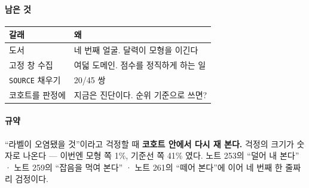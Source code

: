 \documentclass[10pt]{article}
\begin{document}
\paragraph{남은 것}
\begin{center}\small
\begin{tabular}{ll}
\hline
갈래 & 왜 \\
\hline
도서 & 네 번째 얼굴. 달력이 모형을 이긴다 \\
고정 창 수집 & 여덟 도메인. 점수를 정직하게 하는 일 \\
\texttt{SOURCE} 채우기 & 20/45 쌍 \\
코호트를 판정에 & 지금은 진단이다. 순위 기준으로 쓰면? \\
\hline
\end{tabular}
\end{center}

\paragraph{규약} ``라벨이 오염됐을 것''이라고 걱정할 때 \textbf{코호트 안에서
다시 재 본다.} 걱정의 크기가 숫자로 나온다 --- 이번엔 모형 쪽 1\%,
기준선 쪽 41\% 였다. 노트 253의 ``덜어 내 본다'' · 노트 259의 ``잡음을
먹여 본다'' · 노트 261의 ``떼어 본다''에 이어 네 번째 한 줄짜리 검정이다.
\end{document}
